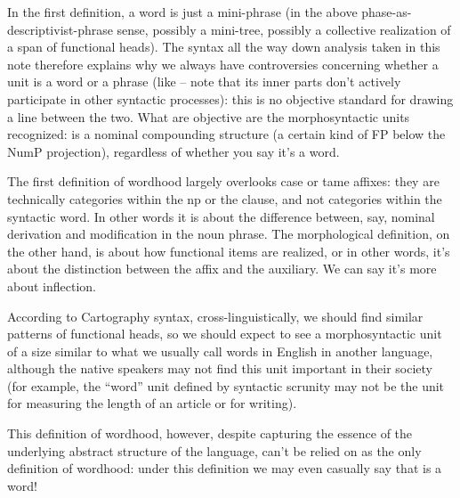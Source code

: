 {In the first definition, a word is just a mini-phrase 
(in the above phase-as-descriptivist-phrase sense, 
possibly a mini-tree, possibly a collective realization of a span of functional heads).
The syntax all the way down analysis taken in this note 
therefore explains why we always have controversies 
concerning whether a unit is a word or a phrase 
(like  
-- note that its inner parts don't actively participate in other syntactic processes):
this is no objective standard for drawing a line between the two. 
What are objective are the morphosyntactic units recognized: 
 is a nominal compounding structure 
(a certain kind of FP below the NumP projection),
regardless of whether you say it's a word. 

The first definition of wordhood largely overlooks 
case or \acs{tame} affixes:
they are technically categories within the \acs{np} or the clause, 
and not categories within the syntactic word.
In other words it is about the difference 
between, say, nominal derivation and modification in the noun phrase.
The morphological definition, on the other hand, 
is about how functional items are realized, 
or in other words, it's about the distinction 
between the affix and the auxiliary.
We can say it's more about inflection.

According to Cartography syntax, 
cross-linguistically, 
we should find similar patterns of functional heads,
so we should expect to see a morphosyntactic unit 
of a size similar to what we usually call words in English 
in another language, 
although the native speakers may not find this unit important in their society 
(for example, the ``word'' unit defined by syntactic scrunity 
may not be the unit for measuring the length of an article or for writing).

This definition of wordhood, however, 
despite capturing the essence of the underlying abstract structure of the language, 
can't be relied on as the only definition of wordhood:
under this definition we may even casually say that 
 is a word!

}
